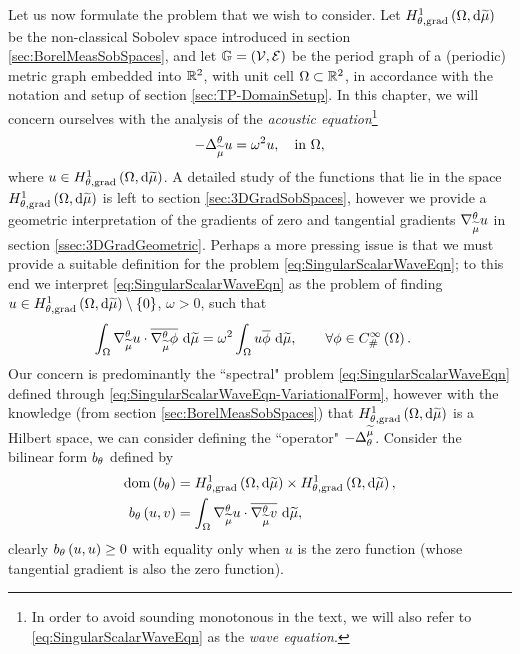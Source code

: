 Let us now formulate the problem that we wish to consider.
Let $H^1_{\theta, \mathrm{grad}}\left( \Omega, \mathrm{d}\widetilde{\mu} \right)$ be the non-classical Sobolev space introduced in section \ref{sec:BorelMeasSobSpaces}, and let $\mathbb{G}=\left( \mathcal{V}, \mathcal{E} \right)$ be the period graph of a (periodic) metric graph embedded into $\mathbb{R}^2$, with unit cell $\Omega\subset\mathbb{R}^2$, in accordance with the notation and setup of section \ref{sec:TP-DomainSetup}.
In this chapter, we will concern ourselves with the analysis of the \emph{acoustic equation}\footnote{In order to avoid sounding monotonous in the text, we will also refer to \eqref{eq:SingularScalarWaveEqn} as the \emph{wave equation}.}
\begin{align} \label{eq:SingularScalarWaveEqn}
	-\Delta_{\widetilde{\mu}}^{\theta} u = \omega^2 u, \quad\text{in } \Omega,
\end{align}
where $u\in H^1_{\theta, \mathrm{grad}}\left( \Omega, \mathrm{d}\widetilde{\mu} \right)$.
A detailed study of the functions that lie in the space $H^1_{\theta, \mathrm{grad}}\left( \Omega, \mathrm{d}\widetilde{\mu} \right)$ is left to section \ref{sec:3DGradSobSpaces}, however we provide a geometric interpretation of the gradients of zero and tangential gradients $\nabla^{\theta}_{\widetilde{\mu}}u$ in section \ref{ssec:3DGradGeometric}.
Perhaps a more pressing issue is that we must provide a suitable definition for the problem \eqref{eq:SingularScalarWaveEqn}; to this end we interpret \eqref{eq:SingularScalarWaveEqn} as the problem of finding $u\in H^1_{\theta, \mathrm{grad}}\left( \Omega, \mathrm{d}\widetilde{\mu} \right)\setminus\left\{ 0 \right\}$, $\omega>0$, such that
\begin{align} \label{eq:SingularScalarWaveEqn-VariationalForm}
	\int_{\Omega} \nabla^{\theta}_{\widetilde{\mu}}u\cdot\overline{\nabla^{\theta}_{\widetilde{\mu}}\phi}  \ \mathrm{d}\widetilde{\mu}
	&= \omega^2 \int_{\Omega} u\overline{\phi}  \ \mathrm{d}\widetilde{\mu},
	\qquad\forall\phi\in C^{\infty}_{\#}\left( \Omega \right).
\end{align}
Our concern is predominantly the ``spectral" problem \eqref{eq:SingularScalarWaveEqn} defined through \eqref{eq:SingularScalarWaveEqn-VariationalForm}, however with the knowledge (from section \ref{sec:BorelMeasSobSpaces}) that $H^1_{\theta, \mathrm{grad}}\left( \Omega, \mathrm{d}\widetilde{\mu} \right)$ is a Hilbert space, we can consider defining the ``operator" $-\Delta_{\theta}^{\widetilde{\mu}}$.
Consider the bilinear form $b_{\theta}$ defined by
\begin{align*}
	\mathrm{dom}\left( b_{\theta} \right) &= H^1_{\theta, \mathrm{grad}}\left( \Omega, \mathrm{d}\widetilde{\mu} \right)\times H^1_{\theta, \mathrm{grad}}\left( \Omega, \mathrm{d}\widetilde{\mu} \right), \\
	b_{\theta}\left( u,v \right) &= \int_{\Omega} \nabla^{\theta}_{\widetilde{\mu}}u\cdot\overline{\nabla^{\theta}_{\widetilde{\mu}}v}  \ \mathrm{d}\widetilde{\mu},
\end{align*}
clearly $b_{\theta}\left( u,u \right)\geq 0$ with equality only when $u$ is the zero function (whose tangential gradient is also the zero function). 
